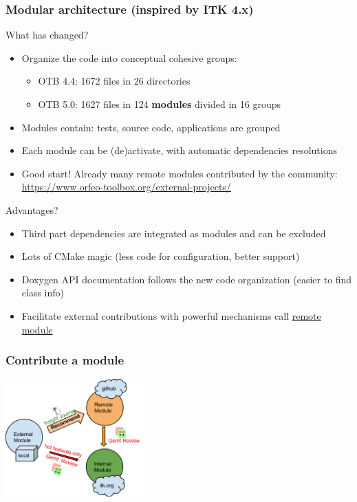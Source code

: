 \documentclass[8pt]{beamer}
\begin{document}
\begin{frame}
\frametitle{Modular architecture (inspired by ITK 4.x)}
\begin{block}{What has changed?}
\begin{itemize}
\item  Organize the code into conceptual cohesive groups:
  \begin{itemize}
    \item OTB 4.4: 1672 files in 26 directories
    \item OTB 5.0: 1627 files in 124 \textbf{modules} divided in 16 groups
  \end{itemize}
\item Modules contain: tests, source code, applications are grouped
\item Each module can be (de)activate, with automatic dependencies resolutions
\item Good start! Already many remote modules contributed by the community: \url{https://www.orfeo-toolbox.org/external-projects/}
\end{itemize}
\end{block}

\begin{block}{Advantages?}
\begin{itemize}
\item Third part dependencies are integrated as modules and can be excluded
\item Lots of CMake magic (less code for configuration, better support)
\item Doxygen API documentation follows the new code organization (easier to
  find class info)
\item Facilitate external contributions with powerful mechanisms call
  \href{https://www.orfeo-toolbox.org/external-projects/}{\alert{remote module}}
\end{itemize}
\end{block}
\end{frame}

\begin{frame}
\frametitle{Contribute a module}
\begin{center}
 \includegraphics[width=0.4\textwidth]{images/itk-remote-module.png}
\end{center}
\end{frame}
\end{document}

